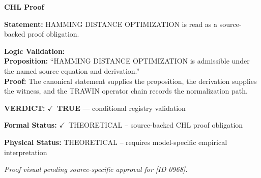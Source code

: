 \vspace{0.45em}
\noindent\textbf{CHL Proof}\par
\textbf{Statement:} HAMMING DISTANCE OPTIMIZATION is read as a source-backed proof obligation.

\textbf{Logic Validation:}\\
\textbf{Proposition:} ``HAMMING DISTANCE OPTIMIZATION is admissible under the named source equation and derivation.''\\
\textbf{Proof:} The canonical statement supplies the proposition, the derivation supplies the witness, and the TRAWIN operator chain records the normalization path.

\textbf{VERDICT:} \ensuremath{\checkmark}\ \textbf{TRUE} --- conditional registry validation

\textbf{Formal Status:} \ensuremath{\checkmark}\ THEORETICAL -- source-backed CHL proof obligation

\textbf{Physical Status:} THEORETICAL -- requires model-specific empirical interpretation
\par\vspace{0.45em}
\par
\vfill
\begingroup\footnotesize\itshape
Proof visual pending source-specific approval for [ID 0968].
\par\endgroup
\vfill
\endgroup
\endgroup
